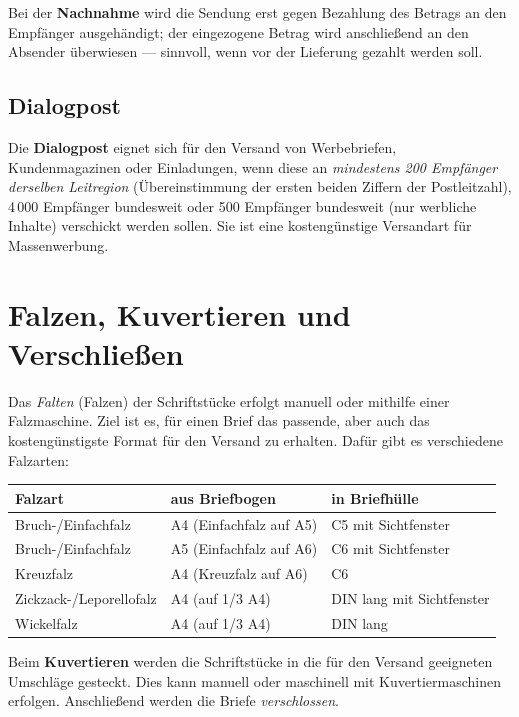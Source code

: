 \documentclass[11pt, a4paper]{article}
\begin{document}
Bei der \textbf{Nachnahme} wird die Sendung erst gegen Bezahlung des Betrags an den
Empfänger ausgehändigt; der eingezogene Betrag wird anschließend an den Absender
überwiesen --- sinnvoll, wenn vor der Lieferung gezahlt werden soll.

\subsection{Dialogpost}

Die \textbf{Dialogpost} eignet sich für den Versand von Werbebriefen, Kundenmagazinen
oder Einladungen, wenn diese an \emph{mindestens 200 Empfänger derselben Leitregion}
(Übereinstimmung der ersten beiden Ziffern der Postleitzahl), 4\,000 Empfänger bundesweit
oder 500 Empfänger bundesweit (nur werbliche Inhalte) verschickt werden sollen. Sie ist
eine kostengünstige Versandart für Massenwerbung.

\section{Falzen, Kuvertieren und Verschließen}

Das \emph{Falten} (Falzen) der Schriftstücke erfolgt manuell oder mithilfe einer
Falzmaschine. Ziel ist es, für einen Brief das passende, aber auch das kostengünstigste
Format für den Versand zu erhalten. Dafür gibt es verschiedene Falzarten:

\begin{center}
\begin{tabular}{p{4cm} p{4cm} p{4.5cm}}
\toprule
\textbf{Falzart} & \textbf{aus Briefbogen} & \textbf{in Briefhülle}\\
\midrule
Bruch-/Einfachfalz & A4 (Einfachfalz auf A5) & C5 mit Sichtfenster\\
Bruch-/Einfachfalz & A5 (Einfachfalz auf A6) & C6 mit Sichtfenster\\
Kreuzfalz & A4 (Kreuzfalz auf A6) & C6\\
Zickzack-/Leporellofalz & A4 (auf 1/3 A4) & DIN lang mit Sichtfenster\\
Wickelfalz & A4 (auf 1/3 A4) & DIN lang\\
\bottomrule
\end{tabular}
\end{center}

\medskip
Beim \textbf{Kuvertieren} werden die Schriftstücke in die für den Versand geeigneten
Umschläge gesteckt. Dies kann manuell oder maschinell mit Kuvertiermaschinen erfolgen.
Anschließend werden die Briefe \emph{verschlossen}.
\end{document}
